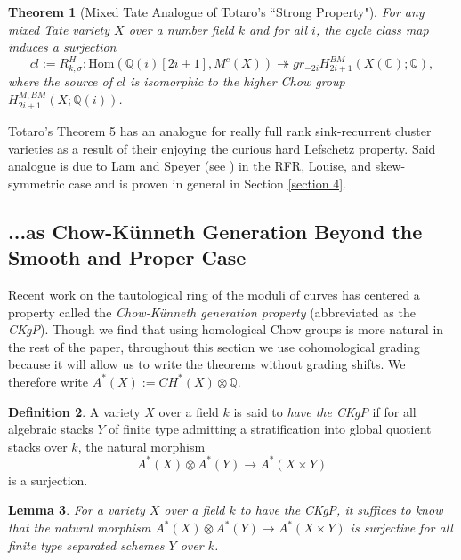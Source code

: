 \documentclass[11pt]{amsart}
\newtheorem{thm}{Theorem}[section]
\newtheorem{lem}[thm]{Lemma}
\theoremstyle{definition}
\newtheorem{defn}[thm]{Definition}
\theoremstyle{remark}
\newcommand{\Hom}{\mathrm{Hom}}
\numberwithin{equation}{section}
\begin{document}
\begin{thm}[Mixed Tate Analogue of Totaro's ``Strong Property"]\label{strong property}
    For any mixed Tate variety $X$ over a number field $k$ and for all $i$, the cycle class map induces a surjection \begin{equation}
        cl := R^H_{k,\sigma}: \Hom(\mathbb{Q}(i)[2i+1], M^c(X))\twoheadrightarrow gr_{-2i}H_{2i+1}^{BM}(X(\mathbb{C});\mathbb{Q}),
    \end{equation}
    where the source of $cl$ is isomorphic to the higher Chow group $H_{2i+1}^{M, BM}(X; \mathbb{Q}(i))$.
\end{thm}

Totaro's Theorem 5 has an analogue for really full rank sink-recurrent cluster varieties as a result of their enjoying the curious hard Lefschetz property. Said analogue is due to Lam and Speyer (see \cite{lam2022cohomology}) in the RFR, Louise, and skew-symmetric case and is proven in general in Section \ref{section 4}.

\subsection{...as Chow-K\"unneth Generation Beyond the Smooth and Proper Case}\label{subsection 3.2}

Recent work on the tautological ring of the moduli of curves has centered a property called the \textit{Chow-K{\"u}nneth generation property} (abbreviated as the \textit{CKgP}). Though we find that using homological Chow groups is more natural in the rest of the paper, throughout this section we use cohomological grading because it will allow us to write the theorems without grading shifts. We therefore write $A^*(X) := CH^*(X) \otimes \mathbb{Q}$.

\begin{defn}
    A variety $X$ over a field $k$ is said to \textit{have the CKgP} if for all algebraic stacks $Y$ of finite type admitting a stratification into global quotient stacks over $k$, the natural morphism \begin{equation}
        A^*(X) \otimes A^*(Y) \rightarrow A^*(X \times Y) \end{equation}\noindent is a surjection.
\end{defn}

\begin{lem}\label{schemes suffice}
    For a variety $X$ over a field $k$ to have the CKgP, it suffices to know that the natural morphism $A^*(X) \otimes A^*(Y) \rightarrow A^*(X \times Y)$ is surjective for all finite type separated schemes $Y$ over $k$.
\end{lem}
\end{document}
